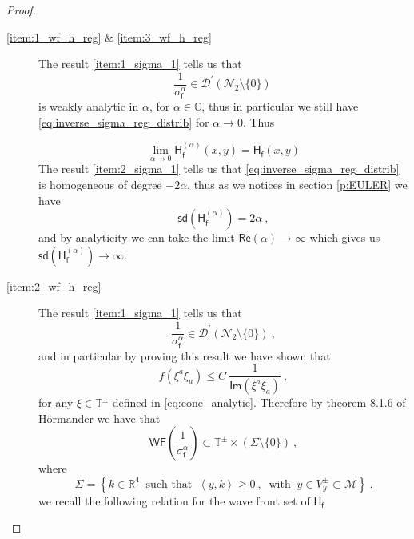 \documentclass[11pt]{book}
\newcommand{\hilight}[1]{\colorbox{yellow!80!black}{#1}}
\newcommand{\WF}{\mathsf{WF}}
\newcommand{\sd}{\mathsf{sd}}
\renewcommand{\Re}{\mathsf{Re}}
\renewcommand{\Im}{\mathsf{Im}}
\newcommand{\sm}[1]{\left\langle#1\right\rangle}
\newcommand{\Dcal}{\mathcal{D}}
\newcommand{\Mcal}{\mathcal{M}}
\newcommand{\Ncal}{\mathcal{N}}
\newcommand{\Cbb}{\mathbb{C}}
\newcommand{\Rbb}{\mathbb{R}}
\newcommand{\Tbb}{\mathbb{T}}
\newcommand{\Hsf}{\mathsf{H}}
\newcommand{\fsf}{\mathsf{f}}
\theoremstyle{break}
\begin{document}
\begin{proof}
\begin{description}
\item[\ref{item:1_wf_h_reg} \& \ref{item:3_wf_h_reg}] 
%
The result \ref{item:1_sigma_1} tells us that 
%
\begin{equation*}
\frac{1}{\sigma_\fsf^\alpha} \in \Dcal^\prime(\Ncal_2\setminus\{0\}) \
\label{eq:inverse_sigma_reg_distrib}
\end{equation*}
%
is weakly analytic in $\alpha$, for $\alpha\in\Cbb$, thus in particular we still have \eqref{eq:inverse_sigma_reg_distrib} for $\alpha\to0$. Thus

\begin{equation*}
\lim_{\alpha\to0} \Hsf^{(\alpha)}_\fsf(x,y) = \Hsf_\fsf(x,y) 
\end{equation*}
%
The result \ref{item:2_sigma_1} tells us that \eqref{eq:inverse_sigma_reg_distrib} is homogeneous of degree $-2\alpha$, thus as we notices in section \ref{p:EULER} we have 
%
\begin{equation*}
\sd(\Hsf^{(\alpha)}_\fsf) = 2\alpha \ ,
\end{equation*}
%
and by analyticity we can take the limit \hilight{$\Re(\alpha) \to \infty$ which gives us $\sd(\Hsf^{(\alpha)}_\fsf)\to\infty$.}
%
%
\item[\ref{item:2_wf_h_reg}] 
%
The result \ref{item:1_sigma_1} tells us that 
%
\begin{equation*}
\frac{1}{\sigma_\fsf^\alpha} \in \Dcal^\prime(\Ncal_2\setminus\{0\}) \ ,
\end{equation*}
%
and in particular by proving this result we have shown that
%
\begin{equation*}
f(\xi^a\xi_{a}) \leq C \ \frac{1}{\Im(\xi^{a}\xi_{a})} \ , 
\end{equation*}
%
for any $\xi \in \Tbb^\pm$ defined in \eqref{eq:cone_analytic}. Therefore by theorem 8.1.6 of Hörmander \cite{hormander_analysis_1990} we have that 
%
\begin{equation}
\WF\left(\frac{1}{\sigma_\fsf^\alpha}\right) \subset  \Tbb^\pm \times \left( \Sigma \setminus \{0\} \right) \ ,
\label{eq:wf_invers_sigma_in_v+-}
\end{equation}
%
where
%
\begin{equation*}
\Sigma = \left\{ k \in \Rbb^4 \ \mbox{ such that } \ \sm{y,k} \geq 0 \ , \ \mbox{ with } \ y \in V^\pm_y \subset \Mcal \right\} \ . 
\end{equation*}
%
we recall the following relation for the wave front set of $\Hsf_\fsf$

\end{description}
\end{proof}
\end{document}
